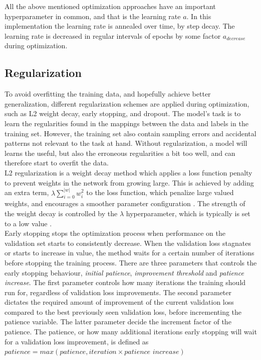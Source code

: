 All the above mentioned optimization approaches have an important hyperparameter in common, and that is the learning rate $a$. In this implementation the learning rate is annealed over time, by step decay. The learning rate is decreased in regular intervals of epochs by some factor $a_{decrease}$ during optimization. \\


\subsection{Regularization}
To avoid overfitting the training data, and hopefully achieve better generalization, different regularization schemes are applied during optimization, such as L2 weight decay, early stopping, and dropout. The model's task is to learn the regularities found in the mappings between the data and labels in the training set. However, the training set also contain sampling errors and accidental patterns not relevant to the task at hand. Without regularization, a model will learns the useful, but also the erroneous regularities a bit too well, and can therefore start to overfit the data. \\

L2 regularization is a weight decay method which applies a loss function penalty to prevent weights in the network from growing large. This is achieved by adding an extra term, $\lambda\sum_{i=0}^{|w|} w_i^2$ to the loss function, which penalize large valued weights, and encourages a smoother parameter configuration \citep{Hinton_regularization}. The strength of the weight decay is controlled by the $\lambda$ hyperparameter, which is typically is set to a low value .\\

Early stopping stops the optimization process when performance on the validation set starts to consistently decrease. When the validation loss stagnates or starts to increase in value, the method waits for a certain number of iterations before stopping the training process. There are three parameters that controls the early stopping behaviour, \textit{initial patience}, \textit{improvement threshold} and \textit{patience increase}. The first parameter controls how many iterations the training should run for, regardless of validation loss improvements. The second parameter dictates the required amount of improvement of the current validation loss compared to the best previously seen validation loss, before incrementing the patience variable. The latter parameter decide the increment factor of the patience. The patience, or how many additional iterations early stopping will wait for a validation loss improvement, is defined as $\textit{patience} = max(\textit{patience}, \textit{iteration} \times \textit{patience increase} )$ \\

